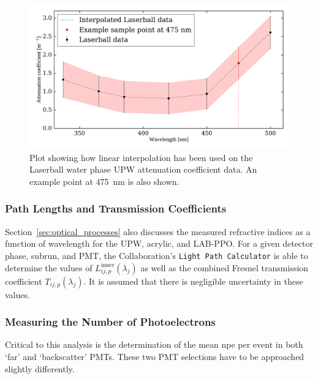 \begin{figure}
    \centering
    \includegraphics[width=\textwidth]{5_SMELLIEAnalysis/images/OCA_water_atten_coeffs_with_interploation.pdf}
    \caption[Linear interpolation being used on Laserball UPW attenuation coefficient data]
    {Plot showing how linear interpolation has been used on the Laserball water phase UPW attenuation coefficient data. An example point at \SI{475}{\nm} is also shown.}
    \label{fig:smellie_laserball_water_ext_length_est}
\end{figure}

\subsubsection{Path Lengths and Transmission Coefficients}
Section~\ref{sec:optical_processes} also discusses the measured refractive indices as a function of wavelength for the UPW, acrylic, and LAB-PPO. For a given detector phase, subrun, and PMT, the Collaboration's \texttt{Light Path Calculator} is able to determine the values of $L_{ij,p}^{\mathrm{inner}}(\lambda_{j})$ as well as the combined Fresnel transmission coefficient $T_{ij,p}(\lambda_{j})$. It is assumed that there is negligible uncertainty in these values.

\subsubsection{Measuring the Number of Photoelectrons}
Critical to this analysis is the determination of the mean npe per event in both `far' and `backscatter' PMTs. These two PMT selections have to be approached slightly differently.

